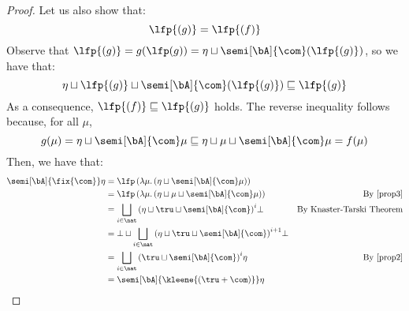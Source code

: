 \begin{proof}
  Let us also show that:
  \begin{equation}\label{prop3}
    \lfp{(g)} = \lfp{(f)}
  \end{equation}
  Observe that
  \(\lfp{(g)} = g(\lfp(g)) = \eta \sqcup
  \semi[\bA]{\com}(\lfp{(g)})\), so we have that:
  \[
    \eta \sqcup \lfp{(g)} \sqcup \semi[\bA]{\com}(\lfp{(g)})
    \sqsubseteq \lfp{(g)}
  \]
  As a consequence, \(\lfp{(f)}\sqsubseteq \lfp{(g)}\) holds. The
  reverse inequality follows because, for all \(\mu\),
  \begin{equation*}
    g(\mu) = \eta \sqcup \semi[\bA]{\com} \mu \sqsubseteq \eta \sqcup \mu \sqcup \semi[\bA]{\com} \mu = f(\mu)
  \end{equation*}
  Then, we have that:
  \begin{align*}
    \semi[\bA]{\fix{\com}} \eta & = \lfp\left({\lambda \mu. \left(\eta \sqcup \semi[\bA]{\com} \mu\right)}\right) \\
    & = \lfp\left({\lambda \mu. \left(\eta \sqcup \mu \sqcup \semi[\bA]{\com} \mu\right)}\right) &  \text{By~\eqref{prop3}}\\
    & = \bigsqcup_{i \in \nat} {\left(\eta \sqcup \tru \sqcup \semi[\bA]{\com}\right)}^i \bot & \text{By Knaster-Tarski Theorem} \\
    & = \bot \sqcup \bigsqcup_{i \in \nat} {\left(\eta \sqcup \tru \sqcup \semi[\bA]{\com}\right)}^{i+1} \bot \\
    & = \bigsqcup_{i \in \nat} {\left(\tru \sqcup \semi[\bA]{\com}\right)}^{i} \eta & \text{By~\eqref{prop2}}\\
    & = \semi[\bA]{\kleene{\left(\tru + \com\right)}} \eta
  \end{align*}  
\end{proof}
